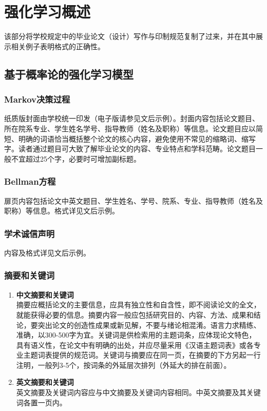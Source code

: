\chapter{强化学习概述}

\label{cha:reinforcement-learning-summary}


该部分将学校规定中的毕业论文（设计）写作与印制规范复制了过来，并在其中展示相关例子表明格式的正确性。


\section{基于概率论的强化学习模型}

\subsection{Markov决策过程}


纸质版封面由学校统一印发（电子版请参见文后示例）。封面内容包括论文题目、所在院系专业、学生姓名学号、指导教师（姓名及职称）等信息。论文题目应以简短、明确的词语恰当概括整个论文的核心内容，避免使用不常见的缩略词、缩写字。读者通过题目可大致了解毕业论文的内容、专业特点和学科范畴。论文题目一般不宜超过25个字，必要时可增加副标题。

\subsection{Bellman方程}

扉页内容包括论文中英文题目、学生姓名、学号、院系、专业、指导教师（姓名及职称）等信息。格式详见文后示例。

\subsection{学术诚信声明}

内容及格式详见文后示例。

\subsection{摘要和关键词}

\begin{enumerate}
    \item \textbf{中文摘要和关键词} \\
    摘要应概括论文的主要信息，应具有独立性和自含性，即不阅读论文的全文，就能获得必要的信息。摘要内容一般应包括研究目的、内容、方法、成果和结论，要突出论文的创造性成果或新见解，不要与绪论相混淆。语言力求精练、准确，以300-500字为宜。关键词是供检索用的主题词条，应体现论文特色，具有语义性，在论文中有明确的出处，并应尽量采用《汉语主题词表》或各专业主题词表提供的规范词。关键词与摘要应在同一页，在摘要的下方另起一行注明，一般列3-5个，按词条的外延层次排列（外延大的排在前面）。
    \item \textbf{英文摘要和关键词} \\
    英文摘要及关键词内容应与中文摘要及关键词内容相同。中英文摘要及其关键词各置一页内。
\end{enumerate}

